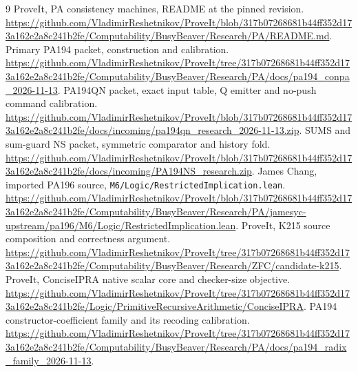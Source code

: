 \documentclass[11pt,letterpaper]{article}
\newcommand{\file}[1]{\nolinkurl{#1}}
\begin{document}
\clearpage
\begin{thebibliography}{9}
 ProveIt, PA consistency machines, README at the pinned
revision. \url{https://github.com/VladimirReshetnikov/ProveIt/blob/317b07268681b44ff352d173a162e2a8c241b2fe/Computability/BusyBeaver/Research/PA/README.md}.
 Primary PA194 packet, construction and calibration.
\url{https://github.com/VladimirReshetnikov/ProveIt/tree/317b07268681b44ff352d173a162e2a8c241b2fe/Computability/BusyBeaver/Research/PA/docs/pa194_conpa_2026-11-13}.
 PA194QN packet, exact input table, Q emitter and no-push
command calibration. \url{https://github.com/VladimirReshetnikov/ProveIt/blob/317b07268681b44ff352d173a162e2a8c241b2fe/docs/incoming/pa194qn_research_2026-11-13.zip}.
 SUMS and sum-guard NS packet, symmetric comparator and
history fold. \url{https://github.com/VladimirReshetnikov/ProveIt/blob/317b07268681b44ff352d173a162e2a8c241b2fe/docs/incoming/PA194NS_research.zip}.
 James Chang, imported PA196 source,
\file{M6/Logic/RestrictedImplication.lean}. \url{https://github.com/VladimirReshetnikov/ProveIt/blob/317b07268681b44ff352d173a162e2a8c241b2fe/Computability/BusyBeaver/Research/PA/jamesyc-upstream/pa196/M6/Logic/RestrictedImplication.lean}.
 ProveIt, K215 source composition and correctness argument.
\url{https://github.com/VladimirReshetnikov/ProveIt/tree/317b07268681b44ff352d173a162e2a8c241b2fe/Computability/BusyBeaver/Research/ZFC/candidate-k215}.
 ProveIt, ConciseIPRA native scalar core and checker-size
objective. \url{https://github.com/VladimirReshetnikov/ProveIt/tree/317b07268681b44ff352d173a162e2a8c241b2fe/Logic/PrimitiveRecursiveArithmetic/ConciseIPRA}.
 PA194 constructor-coefficient family and its recoding
calibration. \url{https://github.com/VladimirReshetnikov/ProveIt/tree/317b07268681b44ff352d173a162e2a8c241b2fe/Computability/BusyBeaver/Research/PA/docs/pa194_radix_family_2026-11-13}.
\end{thebibliography}
\end{document}
